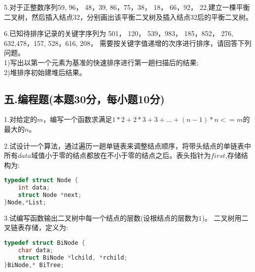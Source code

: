 5.对于正整数序列{59, 96， 48，39, 86，75，38， 18， 66，92， 22},建立一棵平衡二叉树，然后插入结点32，分别画出该平衡二叉树及插入结点32后的平衡二叉树。

6.已知待排序记录的关键字序列为{ 501， 120， 539，983， 185，852， 276, 632,478，157, 528，616, 208}， 需要按关键字值递增的次序进行排序，请回答下列问题。 \\
1)写出以第一个元素为基准的快速排序进行第一趟扫描后的结果; \\
2)堆排序初始建堆后结果。

\subsection{五.编程题(本题30分，每小题10分)}

1.对给定的$m$，编写一个函数求满足$1*2+2*3+3+...+(n-1)*n<=m$的最大的$n$。

2.试设计一个算法，通过遍历一趟单链表来调整结点顺序，将带头结点的单链表中所有$data$域值小于零的结点都放在不小于零的结点之后。表头指针为$first$,存储结构为:
\begin{lstlisting}[language=cpp]
typedef struct Node {
    int data;
    struct Node *next;
}Node,*List;
\end{lstlisting}

3.试编写函数输出二叉树中每一个结点的层数(设根结点的层数为$1$)。 二叉树用二叉链表存储，定义为:
\begin{lstlisting}[language=cpp]
typedef struct BiNode {
    char data; 
    struct BiNode *lchild, *rchild;
}BiNode,* BiTree;
\end{lstlisting}